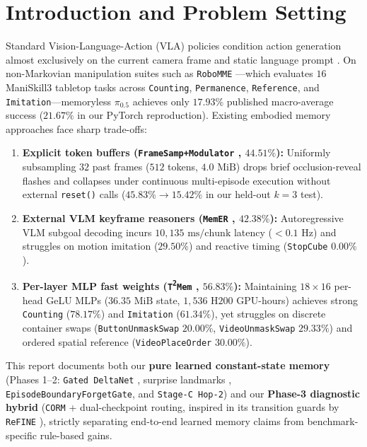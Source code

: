 \documentclass[10pt]{article}
\begin{document}
\begin{abstract}
\end{abstract}

\section{Introduction and Problem Setting}
Standard Vision-Language-Action (VLA) policies condition action generation almost exclusively on the current camera frame and static language prompt \cite{pi05_2025,smolvla2025}. On non-Markovian manipulation suites such as \texttt{RoboMME} \cite{mmevla2026}---which evaluates $16$ ManiSkill3 tabletop tasks across \texttt{Counting}, \texttt{Permanence}, \texttt{Reference}, and \texttt{Imitation}---memoryless $\pi_{0.5}$ achieves only $17.93\%$ published macro-average success ($21.67\%$ in our PyTorch reproduction). Existing embodied memory approaches face sharp trade-offs:
\begin{enumerate}[leftmargin=1.6em,nosep]
  \item \textbf{Explicit token buffers (\texttt{FrameSamp+Modulator} \cite{mmevla2026}, $44.51\%$):} Uniformly subsampling $32$ past frames ($512$ tokens, $4.0\text{ MiB}$) drops brief occlusion-reveal flashes and collapses under continuous multi-episode execution without external \texttt{reset()} calls \cite{robommeinterf2026} ($45.83\% \to 15.42\%$ in our held-out $k=3$ test).
  \item \textbf{External VLM keyframe reasoners (\texttt{MemER} \cite{mmevla2026}, $42.38\%$):} Autoregressive VLM subgoal decoding incurs $10{,}135\text{ ms/chunk}$ latency ($<0.1\text{ Hz}$) and struggles on motion imitation ($29.50\%$) and reactive timing (\texttt{StopCube} $0.00\%$).
  \item \textbf{Per-layer MLP fast weights (\texttt{T\textsuperscript{2}Mem} \cite{t2mem2026}, $56.83\%$):} Maintaining $18 \times 16$ per-head GeLU MLPs ($36.35\text{ MiB}$ state, $1{,}536\text{ H200}$ GPU-hours) achieves strong \texttt{Counting} ($78.17\%$) and \texttt{Imitation} ($61.34\%$), yet struggles on discrete container swaps (\texttt{Button\allowbreak Unmask\allowbreak Swap} $20.00\%$, \texttt{Video\allowbreak Unmask\allowbreak Swap} $29.33\%$) and ordered spatial reference (\texttt{Video\allowbreak Place\allowbreak Order} $30.00\%$).
\end{enumerate}

This report documents both our \textbf{pure learned constant-state memory} (Phases 1--2: \texttt{Gated DeltaNet} \cite{yang2025gdn,grazzi2025unlocking}, surprise landmarks \cite{behrouz2025titans}, \texttt{EpisodeBoundaryForgetGate}, and \texttt{Stage-C Hop-2}) and our \textbf{Phase-3 diagnostic hybrid} (\texttt{CORM} + dual-checkpoint routing, inspired in its transition guards by \texttt{ReFINE} \cite{hong2026refine}), strictly separating end-to-end learned memory claims from benchmark-specific rule-based gains.
\end{document}
